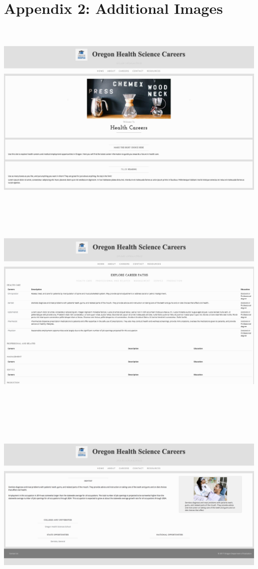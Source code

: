 \documentclass[onecolumn, draftclsnofoot,10pt, compsoc]{IEEEtran}
\begin{document}
\newpage
\section{Appendix 2: Additional Images}
\vspace{.8cm}
\includegraphics[width=16.78cm, height=9.67cm]{webiste1.png}
\\ \\
\includegraphics[width=16.78cm, height=9.67cm]{webiste2.png}
\\ \\
\includegraphics[width=16.78cm, height=9.67cm]{website3.png}
\end{document}
